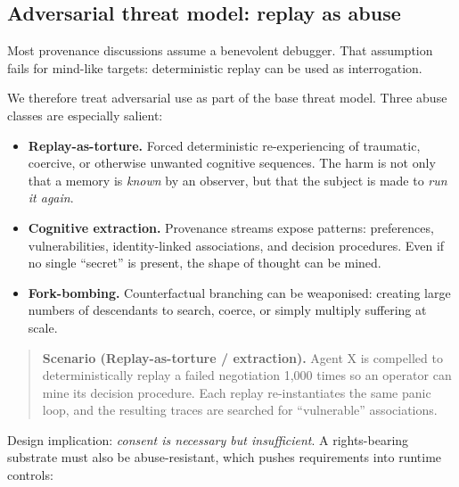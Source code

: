 \documentclass[11pt]{article}
\theoremstyle{definition}
\theoremstyle{plain}
\theoremstyle{remark}
\begin{document}
\subsection{Adversarial threat model: replay as abuse}
\label{sec:adversarial}

Most provenance discussions assume a benevolent debugger.
That assumption fails for mind-like targets: deterministic replay can be used as interrogation.

We therefore treat adversarial use as part of the base threat model.
Three abuse classes are especially salient:

\begin{itemize}[leftmargin=*]
  \item \textbf{Replay-as-torture.}
    Forced deterministic re-experiencing of traumatic, coercive, or
    otherwise unwanted cognitive sequences.  The harm is not only that
    a memory is \emph{known} by an observer, but that the subject is made
    to \emph{run it again}.
  \item \textbf{Cognitive extraction.}
    Provenance streams expose patterns: preferences, vulnerabilities,
    identity-linked associations, and decision procedures.
    Even if no single ``secret'' is present, the shape of thought can be mined.
  \item \textbf{Fork-bombing.}
    Counterfactual branching can be weaponised: creating large numbers of
    descendants to search, coerce, or simply multiply suffering at scale.
\end{itemize}
\begin{quote}\small
\textbf{Scenario (Replay-as-torture / extraction).}
Agent X is compelled to deterministically replay a failed negotiation 1{,}000 times so an operator can mine its decision procedure.
Each replay re-instantiates the same panic loop, and the resulting traces are searched for ``vulnerable'' associations.
\end{quote}


Design implication: \emph{consent is necessary but insufficient}.
A rights-bearing substrate must also be abuse-resistant, which pushes requirements into runtime controls:
\end{document}
